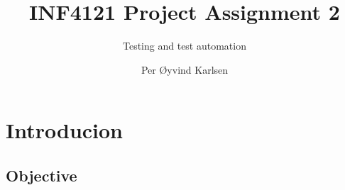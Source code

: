 \documentclass[UKenglish]{article}  %
\title{INF4121 Project Assignment 2}
\subtitle{Testing and test automation}
\author{Per Øyvind Karlsen}
\begin{document}
\ififorside

\section{Introducion}

\subsection{Objective}
\end{document}

